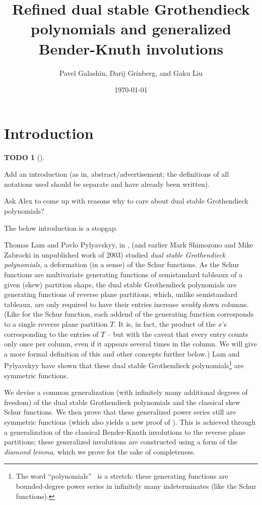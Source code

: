\documentclass[numbers=enddot,12pt,final,onecolumn,notitlepage]{scrartcl}%
\theoremstyle{definition}
\newtheorem{quest}[theo]{TODO}
\newenvironment{todo}[1][]
{\begin{quest}[#1]\begin{leftbar}}
{\end{leftbar}\end{quest}}
\begin{document}
\title{Refined dual stable Grothendieck polynomials and generalized Bender-Knuth involutions}
\author{Pavel Galashin, Darij Grinberg, and Gaku Liu}
\date{\today}
\maketitle

\section{Introduction}

\begin{todo}
Add an introduction (as in, abstract/advertisement; the definitions of all
notations used should be separate and have already been written).

Ask Alex to come up with reasons why to care about dual stable Grothendieck polynomials?

The below introduction is a stopgap.
\end{todo}

Thomas Lam and Pavlo Pylyavskyy, in \cite[\S 9.1]{LamPyl}, (and earlier Mark
Shimozono and Mike Zabrocki in unpublished work of 2003) studied \textit{dual
stable Grothendieck polynomials}, a deformation (in a sense) of the Schur
functions. As the Schur functions are multivariate generating functions of
semistandard tableaux of a given (skew) partition shape, the dual stable
Grothendieck polynomials are generating functions of reverse plane partitions,
which, unlike semistandard tableaux, are only required to have their entries
increase \textit{weakly} down columns. (Like for the Schur function, each
addend of the generating function corresponds to a single reverse plane
partition $T$. It is, in fact, the product of the $x$'s corresponding to the
entries of $T$ -- but with the caveat that every entry counts only once per
column, even if it appears several times in the column. We will give a more
formal definition of this and other concepts further below.) Lam and
Pylyavskyy have shown that these dual stable Grothendieck
polynomials\footnote{The word \textquotedblleft polynomials\textquotedblright%
\ is a stretch: these generating functions are bounded-degree power series in
infinitely many indeterminates (like the Schur functions).} are symmetric functions.

We devise a common generalization (with infinitely many additional degrees of
freedom) of the dual stable Grothendieck polynomials and the classical skew
Schur functions. We then prove that these generalized power series still are
symmetric functions (which also yields a new proof of \cite[Theorem
9.1]{LamPyl}). This is achieved through a generalization of the classical
Bender-Knuth involutions to the reverse plane partitions; these generalized
involutions are constructed using a form of the \textit{diamond lemma}, which
we prove for the sake of completeness.
\end{document}
